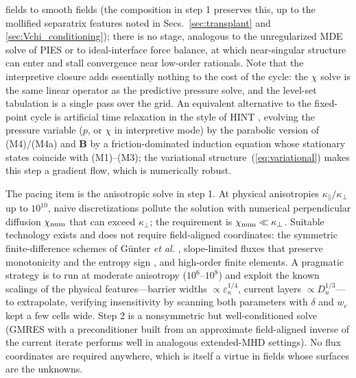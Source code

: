 \documentclass[english]{article}
\newcommand{\bB}{\mathbf{B}}
\begin{document}
fields to smooth fields (the composition in step 1 preserves this, up to the mollified
separatrix features noted in Secs.~\ref{sec:transplant} and \ref{sec:Vchi_conditioning}); there is
no stage, analogous to the unregularized MDE solve of PIES or to ideal-interface force balance, at
which near-singular structure can enter and stall convergence near low-order rationals. Note that
the interpretive closure adds essentially nothing to the cost of the cycle: the $\chi$ solve is
the same linear operator as the predictive pressure solve, and the level-set tabulation is a
single pass over the grid. An
equivalent alternative to the fixed-point cycle is artificial time relaxation in the style of HINT
\cite{harafuji1989,suzuki2006}, evolving the pressure variable ($p$, or $\chi$ in interpretive
mode) by the parabolic version of (M4)/(M4a) and $\bB$ by a
friction-dominated induction equation whose stationary states coincide with (M1)--(M3); the
variational structure~(\ref{eq:variational}) makes this step a gradient flow, which is
numerically robust.

The pacing item is the anisotropic solve in step 1. At physical anisotropies
$\kappa_\parallel/\kappa_\perp$ up to $10^{10}$, naive discretizations pollute the solution with
numerical perpendicular diffusion $\chi_{\rm num}$ that can exceed $\kappa_\perp$; the requirement
is $\chi_{\rm num}\ll\kappa_\perp$. Suitable technology exists and does not require field-aligned
coordinates: the symmetric finite-difference schemes of G\"unter \emph{et al.}
\cite{gunter2005}, slope-limited fluxes that preserve monotonicity and the entropy sign
\cite{sharma2007}, and high-order finite elements. A pragmatic strategy is to run at moderate
anisotropy ($10^{6}$--$10^{8}$) and exploit the known scalings of the physical features---barrier
widths $\propto\varepsilon_\kappa^{1/4}$, current layers $\propto D_u^{1/3}$---to extrapolate,
verifying insensitivity by scanning both parameters with $\delta$ and $w_c$ kept a few cells wide.
Step 2 is a nonsymmetric but well-conditioned solve (GMRES with a preconditioner built from an
approximate field-aligned inverse of the current iterate performs well in analogous extended-MHD
settings). No flux coordinates are required anywhere, which is itself a virtue in fields whose
surfaces are the unknowns.
\end{document}
